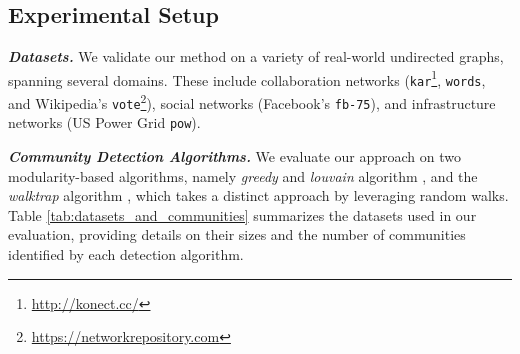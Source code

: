 


\subsection{Experimental Setup}


\textbf{\textit{Datasets.}} We validate our method on a variety of real-world undirected graphs, spanning several domains. These include collaboration networks (\texttt{kar}\footnote{\label{fn:konect}\href{http://konect.cc/}{http://konect.cc/}}, \texttt{words}, and Wikipedia's \texttt{vote}\footnote{\label{fn:networkrepo}\href{https://networkrepository.com}{https://networkrepository.com}}), %
social networks (Facebook's \texttt{fb-75}), and infrastructure networks (US Power Grid \texttt{pow}).

\textbf{\textit{Community Detection Algorithms.}} 
We evaluate our approach on two modularity-based algorithms, namely  \textit{greedy} \cite{greedy_detection_alg} and \textit{louvain} algorithm \cite{louvain_detection_alg}, and the \textit{walktrap} algorithm \cite{walktrap_detection_alg}, which takes a distinct approach by leveraging random walks. \\
Table \ref{tab:datasets_and_communities} summarizes the datasets used in our evaluation, providing details on their sizes and the number of communities identified by each detection algorithm.

